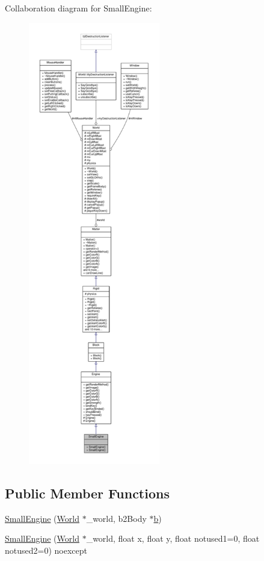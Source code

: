 Collaboration diagram for Small\+Engine\+:\nopagebreak
\begin{figure}[H]
\begin{center}
\leavevmode
\includegraphics[height=550pt]{classSmallEngine__coll__graph}
\end{center}
\end{figure}
\subsection*{Public Member Functions}
\begin{DoxyCompactItemize}
\item 
\hyperlink{classSmallEngine_a76117f2efaa1d74f0c992bf0201c2244}{Small\+Engine} (\hyperlink{classWorld}{World} $\ast$\+\_\+world, b2\+Body $\ast$\hyperlink{image_8h_ab2d05693952610f937e5acb3c4a8fa1b}{b})
\item 
\hyperlink{classSmallEngine_a31761c59f4f039e5c735fec59191a531}{Small\+Engine} (\hyperlink{classWorld}{World} $\ast$\+\_\+world, float x, float y, float notused1=0, float notused2=0) noexcept
\end{DoxyCompactItemize}

